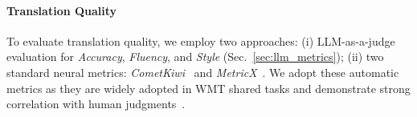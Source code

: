 \documentclass[11pt]{article}
\begin{document}
\paragraph{Translation Quality} To evaluate translation quality, we employ two approaches: (i) LLM-as-a-judge evaluation for \textit{Accuracy}, \textit{Fluency}, and \textit{Style} (Sec.~\ref{sec:llm_metrics}); (ii) two standard neural metrics: \textit{CometKiwi}~\cite{DBLP:conf/emnlp/ChimotoB22} and \textit{MetricX}~\cite{DBLP:conf/wmt/JuraskaDFF24}. We adopt these automatic metrics as they are widely adopted in WMT shared tasks and demonstrate strong correlation with human judgments~\cite{andrews-etal-2025-bouquet,kocmi-etal-2025-findings}.







\end{document}
